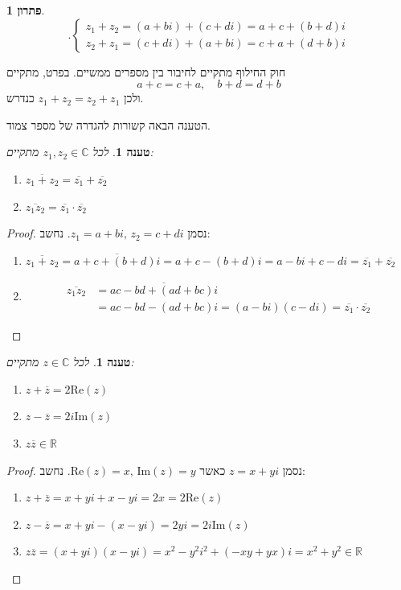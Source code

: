 \documentclass[12pt]{report}
\theoremstyle{plain}
\newtheorem{proposition}[theorem]{טענה}
\theoremstyle{definition}
\newtheorem*{solution}{פתרון}
\newcommand{\R}{\mathbb{R}}
\newcommand{\C}{\mathbb{C}}
\newcommand{\0}{\mathbf{0}}
\begin{document}
\begin{solution}
$$
.\begin{cases}
z_{1}+z_{2}=(a+bi)+(c+di)=a+c+(b+d)i\\
z_{2}+z_{1}=(c+di)+(a+bi)=c+a+(d+b)i
\end{cases}
$$

חוק החילוף מתקיים לחיבור בין מספרים ממשיים. בפרט, מתקיים
$$
a+c=c+a, \quad b+d=d+b
$$
ולכן
$z_1+z_2=z_2+z_1$
כנדרש.
\end{solution}

הטענה הבאה קשורות להגדרה של מספר צמוד.

\begin{proposition}
לכל
$z_{1},z_{2}\in\C$
מתקיים:
\begin{enumerate}[label=\alph*.]
\item $\overline{z_{1}+z_{2}}=\overline{z_{1}}+\overline{z_{2}}$
\item $\overline{z_{1}z_{2}}=\overline{z_{1}}\cdot\overline{z_{2}}$
\end{enumerate}
\end{proposition}

\begin{proof} נסמן $z_{1}=a+bi,\,z_{2}=c+di$. נחשב:
\begin{enumerate}[label=\alph*.]
\item $\overline{z_{1}+z_{2}}=\overline{a+c+(b+d)i}=a+c-(b+d)i=a-bi+c-di=\overline{z_{1}}+\overline{z_{2}}$
\item 
$$
\begin{aligned}
\overline{z_{1}z_{2}}&=\overline{ac-bd+(ad+bc)i} \\
&=ac-bd-(ad+bc)i=(a-bi)(c-di)=\overline{z_{1}}\cdot\overline{z_{2}}
\end{aligned}
$$
\end{enumerate}
\end{proof}

\begin{proposition}
לכל
$z\in\C$
מתקיים:
\begin{enumerate}[label=\alph*.]
\item $z+\overline{z}=2\text{{Re}}(z)$
\item $z-\overline{z}=2i\text{{Im}}(z)$
\item $z\overline{z}\in\R$ 
\end{enumerate}
\end{proposition}

\begin{proof} נסמן $z=x+yi$ כאשר $\text{{Re}}(z)=x,\,\text{{Im}}(z)=y$.
נחשב:
\begin{enumerate}[label=\alph*.]
\item $z+\overline{z}=x+yi+x-yi=2x=2\text{{Re}}(z)$
\item $z-\overline{z}=x+yi-(x-yi)=2yi=2i\text{{Im}}(z)$
\item $z\overline{z}=(x+yi)(x-yi)=x^{2}-y^{2}i^{2}+(-xy+yx)i=x^{2}+y^{2}\in\R$
\end{enumerate}
\end{proof}
\end{document}
